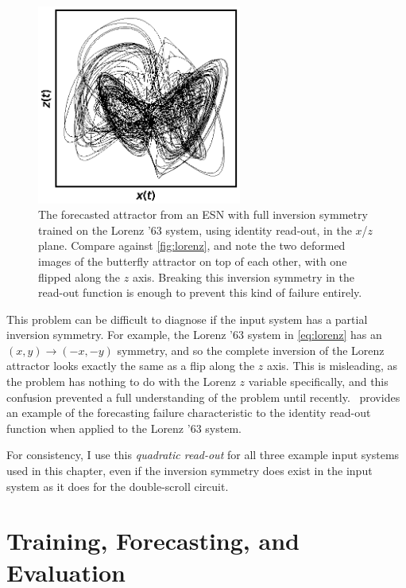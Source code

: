 \begin{figure}
  \includegraphics[width=0.6\textwidth]{figures/lorenz-symmetry}
  \caption{The forecasted attractor from an ESN with full inversion
    symmetry trained on the Lorenz '63 system, using identity
    read-out, in the $x$/$z$ plane. Compare against \cref{fig:lorenz},
    and note the two deformed images of the butterfly attractor on top
    of each other, with one flipped along the $z$ axis. Breaking this
    inversion symmetry in the read-out function is enough to prevent
    this kind of failure entirely.}
  \label{fig:lorenz-symmetry}
\end{figure}

This problem can be difficult to diagnose if the input system has a
partial inversion symmetry. For example, the Lorenz '63 system in
\cref{eq:lorenz} has an $(x, y) \rightarrow (-x, -y)$ symmetry, and so the
complete inversion of the Lorenz attractor looks exactly the same as a
flip along the $z$ axis. This is misleading, as the problem has
nothing to do with the Lorenz $z$ variable specifically, and this
confusion prevented a full understanding of the problem until
recently.~\cite{herteux2020}  provides an
example of the forecasting failure characteristic to the identity
read-out function when applied to the Lorenz '63 system.

For consistency, I use this \emph{quadratic read-out} for all three
example input systems used in this chapter, even if the inversion
symmetry does exist in the input system as it does for the double-scroll
circuit.

\section{Training, Forecasting, and Evaluation}

